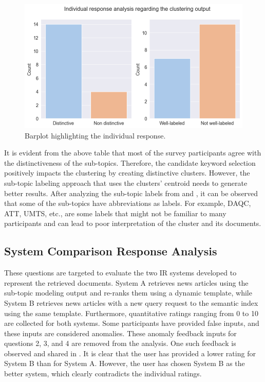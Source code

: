 \begin{figure}[h]
	\centering
	\includegraphics[width=.9\textwidth]{images/subplots/barplots.png}
	\caption{Barplot highlighting the individual response.  \label{fig:question_1_barplot}}
\end{figure}


It is evident from the above table that most of the survey participants agree with the distinctiveness of the sub-topics. Therefore, the candidate keyword selection positively impacts the clustering by creating distinctive clusters. However, the sub-topic labeling approach that uses the clusters' centroid needs to generate better results. After analyzing the sub-topic labels from  and , it can be observed that some of the sub-topics have abbreviations as labels. For example, DAQC, ATT, UMTS, etc., are some labels that might not be familiar to many participants and can lead to poor interpretation of the cluster and its documents.

\subsection{System Comparison Response Analysis}

These questions are targeted to evaluate the two IR systems developed to represent the retrieved documents. System A retrieves news articles using the sub-topic modeling output and re-ranks them using a dynamic template, while System B retrieves news articles with a new query request to the semantic index using the same template. Furthermore, quantitative ratings ranging from 0 to 10 are collected for both systems. Some participants have provided false inputs, and these inputs are considered anomalies. These anomaly feedback inputs for questions 2, 3, and 4 are removed from the analysis. One such feedback is observed and shared in . It is clear that the user has provided a lower rating for System B than for System A. However, the user has chosen System B as the better system, which clearly contradicts the individual ratings.


